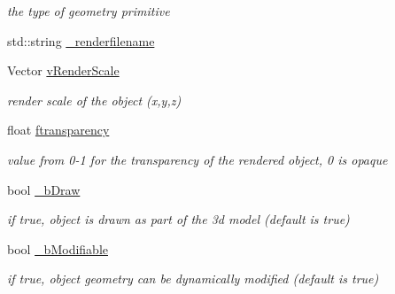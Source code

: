 \begin{DoxyCompactItemize}
\begin{DoxyCompactList}\small\item\em the type of geometry primitive \item\end{DoxyCompactList}\item 
std::string \hyperlink{classOpenRAVE_1_1KinBody_1_1Link_1_1GEOMPROPERTIES_a13d02d4b3303b3acce44af4330fb5fde}{\_\-renderfilename}
\item 
\hypertarget{classOpenRAVE_1_1KinBody_1_1Link_1_1GEOMPROPERTIES_a0fbaf8a5fc118f2b82607c21e98c0a74}{
Vector \hyperlink{classOpenRAVE_1_1KinBody_1_1Link_1_1GEOMPROPERTIES_a0fbaf8a5fc118f2b82607c21e98c0a74}{vRenderScale}}
\label{classOpenRAVE_1_1KinBody_1_1Link_1_1GEOMPROPERTIES_a0fbaf8a5fc118f2b82607c21e98c0a74}

\begin{DoxyCompactList}\small\item\em render scale of the object (x,y,z) \item\end{DoxyCompactList}\item 
\hypertarget{classOpenRAVE_1_1KinBody_1_1Link_1_1GEOMPROPERTIES_a7e9bda892b07417274d200ecf6a19743}{
float \hyperlink{classOpenRAVE_1_1KinBody_1_1Link_1_1GEOMPROPERTIES_a7e9bda892b07417274d200ecf6a19743}{ftransparency}}
\label{classOpenRAVE_1_1KinBody_1_1Link_1_1GEOMPROPERTIES_a7e9bda892b07417274d200ecf6a19743}

\begin{DoxyCompactList}\small\item\em value from 0-\/1 for the transparency of the rendered object, 0 is opaque \item\end{DoxyCompactList}\item 
\hypertarget{classOpenRAVE_1_1KinBody_1_1Link_1_1GEOMPROPERTIES_a570497cb0feb2ef7ab31b3a899f2251d}{
bool \hyperlink{classOpenRAVE_1_1KinBody_1_1Link_1_1GEOMPROPERTIES_a570497cb0feb2ef7ab31b3a899f2251d}{\_\-bDraw}}
\label{classOpenRAVE_1_1KinBody_1_1Link_1_1GEOMPROPERTIES_a570497cb0feb2ef7ab31b3a899f2251d}

\begin{DoxyCompactList}\small\item\em if true, object is drawn as part of the 3d model (default is true) \item\end{DoxyCompactList}\item 
\hypertarget{classOpenRAVE_1_1KinBody_1_1Link_1_1GEOMPROPERTIES_ae91866aa8217eccdfc515df0474872fe}{
bool \hyperlink{classOpenRAVE_1_1KinBody_1_1Link_1_1GEOMPROPERTIES_ae91866aa8217eccdfc515df0474872fe}{\_\-bModifiable}}
\label{classOpenRAVE_1_1KinBody_1_1Link_1_1GEOMPROPERTIES_ae91866aa8217eccdfc515df0474872fe}

\begin{DoxyCompactList}\small\item\em if true, object geometry can be dynamically modified (default is true) \item\end{DoxyCompactList}\end{DoxyCompactItemize}


